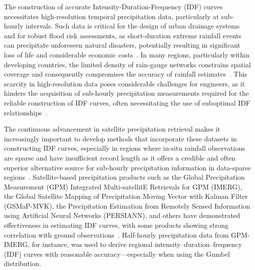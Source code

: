 The construction of accurate Intensity-Duration-Frequency (IDF) curves necessitates high-resolution temporal precipitation data, particularly at sub-hourly intervals. Such data is critical for the design of urban drainage systems and for robust flood risk assessments, as short-duration extreme rainfall events can precipitate unforeseen natural disasters, potentially resulting in significant loss of life and considerable economic costs~\cite{hess-28-375-2024}.
In many regions, particularly within developing countries, the limited density of rain-gauge networks constrains spatial coverage and consequently compromises the accuracy of rainfall estimates~\cite{basumatary2016}. This scarcity in high-resolution data poses considerable challenges for engineers, as it hinders the acquisition of sub-hourly precipitation measurements required for the reliable construction of IDF curves, often necessitating the use of suboptimal IDF relationships~\cite{basumatary2016}.

The continuous advancement in satellite precipitation retrieval makes it increasingly important to develop methods that incorporate these datasets in constructing IDF curves, especially in regions where in-situ rainfall observations are sparse and have insufficient record length as it offers a credible and often superior alternative source for sub-hourly precipitation information in data-sparse regions~\cite{ombadi2018}. Satellite-based precipitation products such as the Global Precipitation Measurement (GPM) Integrated Multi-satellitE Retrievals for GPM (IMERG), the Global Satellite Mapping of Precipitation Moving Vector with Kalman Filter (GSMaP-MVK), the Precipitation Estimation from Remotely Sensed Information using Artificial Neural Networks (PERSIANN), and others have demonstrated effectiveness in estimating IDF curves, with some products showing strong correlation with ground observations~\cite{ombadi2018, rs14195032}. Half-hourly precipitation data from GPM-IMERG, for instance, was used to derive regional intensity–duration–frequency (IDF) curves with reasonable accuracy—especially when using the Gumbel distribution.~\cite{rs14195032}

\vspace{1em}

